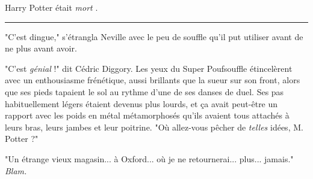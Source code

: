 Harry Potter était \emph{mort} .
\par\noindent\rule{\textwidth}{0.4pt}
"C'est dingue," s'étrangla Neville avec le peu de souffle qu'il put utiliser avant de ne plus avant avoir.

"C'est \emph{génial}  !" dit Cédric Diggory. Les yeux du Super Poufsouffle étincelèrent avec un enthousiasme frénétique, aussi brillants que la sueur sur son front, alors que ses pieds tapaient le sol au rythme d'une de ses danses de duel. Ses pas habituellement légers étaient devenus plus lourds, et ça avait peut-être un rapport avec les poids en métal métamorphosés qu'ils avaient tous attachés à leurs bras, leurs jambes et leur poitrine. "Où allez-vous pêcher de \emph{telles}  idées, M. Potter ?"

"Un étrange vieux magasin... à Oxford... où je ne retournerai... plus... jamais." \emph{Blam.} 

